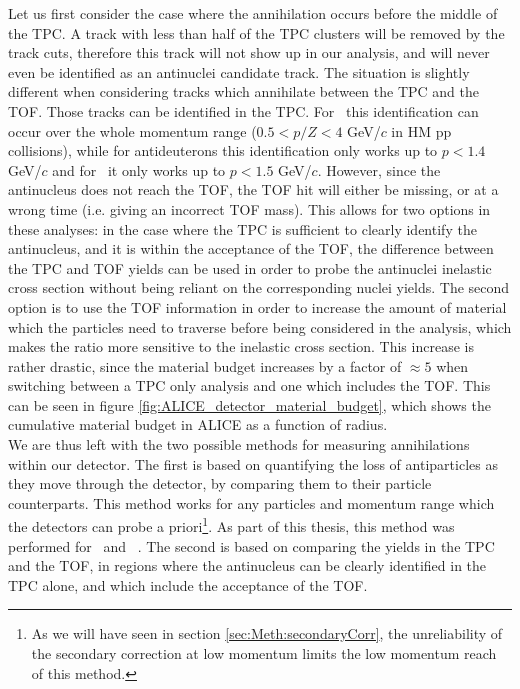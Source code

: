 Let us first consider the case where the annihilation occurs before the middle of the TPC. A track with less than half of the TPC clusters will be removed by the track cuts, therefore this track will not show up in our analysis, and will never even be identified as an antinuclei candidate track. The situation is slightly different when considering tracks which annihilate between the TPC and the TOF. Those tracks can be identified in the TPC. For \ahe\ this identification can occur over the whole momentum range ($0.5<p/Z<4$ GeV/$c$ in HM pp collisions), while for antideuterons this identification only works up to $p<1.4$ GeV/$c$ and for \atrit\ it only works up to $p<1.5$ GeV/$c$. However, since the antinucleus does not reach the TOF, the TOF hit will either be missing, or at a wrong time (i.e. giving an incorrect TOF mass). This allows for two options in these analyses: in the case where the TPC is sufficient to clearly identify the antinucleus, and it is within the acceptance of the TOF, the difference between the TPC and TOF yields can be used in order to probe the antinuclei inelastic cross section without being reliant on the corresponding nuclei yields. The second option is to use the TOF information in order to increase the amount of material which the particles need to traverse before being considered in the analysis, which makes the ratio more sensitive to the inelastic cross section. This increase is rather drastic, since the material budget increases by a factor of $\approx 5$ when switching between a TPC only analysis and one which includes the TOF. This can be seen in figure \ref{fig:ALICE_detector_material_budget}, which shows the cumulative material budget in ALICE as a function of radius. \\

We are thus left with the two possible methods for measuring annihilations within our detector. The first is based on quantifying the loss of antiparticles as they move through the detector, by comparing them to their particle counterparts. This method works for any particles and momentum range which the detectors can probe a priori\footnote{As we will have seen in section \ref{sec:Meth:secondaryCorr}, the unreliability of the secondary correction at low momentum limits the low momentum reach of this method.}. As part of this thesis, this method was performed for \ahe\ and \atrit\ . The second is based on comparing the yields in the TPC and the TOF, in regions where the antinucleus can be clearly identified in the TPC alone, and which include the acceptance of the TOF. \\

